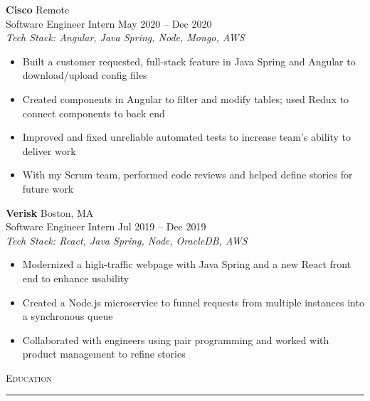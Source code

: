 \documentclass[11pt]{article}
\begin{document}
\begin{raggedright}
	\textbf{\large Cisco} \hfill Remote  \\
	Software Engineer Intern \hfill May 2020 -- Dec 2020 \\

	\textit{Tech Stack: Angular, Java Spring, Node, Mongo, AWS} \\
	\begin{itemize}
		\item Built a customer requested, full-stack feature in Java Spring and Angular to download/upload config files
		\item Created components in Angular to filter and modify tables; used Redux to connect components to back end
		\item Improved and fixed unreliable automated tests to increase team's ability to deliver work
		\item With my Scrum team, performed code reviews and helped define stories for future work	\end{itemize}
	\vspace{0.1in}
	
	\textbf{\large Verisk} \hfill Boston, MA \\
	Software Engineer Intern \hfill Jul 2019 -- Dec 2019 \\
	\textit{Tech Stack: React, Java Spring, Node, OracleDB, AWS} \\
	\begin{itemize}
		\item Modernized a high-traffic webpage with Java Spring and a new React front end to enhance usability
		\item Created a Node.js microservice to funnel requests from multiple instances into a synchronous queue
		\item Collaborated with engineers using pair programming and worked with product management to refine stories
	\end{itemize}
	\vspace{0.2in}
	

	\textsc{\Large Education} \\
	\vspace{-0.1in}
	\rule{\textwidth}{0.4pt} \\
	\vspace{0.05in}


\end{raggedright}
\end{document}
